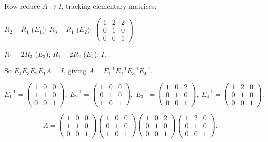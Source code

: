\documentclass[12pt,a3paper]{article}
\begin{document}
\begin{tcolorbox}[enhanced,breakable,
  colback=cB!4,colframe=cB,boxrule=0.8pt,arc=5pt,
  title={\textbf{Answer --- Factorize $A=\begin{pmatrix}1&2&2\\1&3&2\\1&2&3\end{pmatrix}$ into Elementary Matrices}},
  fonttitle=\bfseries\color{white},colbacktitle=cB]

Row reduce $A\to I$, tracking elementary matrices:

$R_2-R_1$ ($E_1$); $R_3-R_1$ ($E_2$):
$\begin{pmatrix}1&2&2\\0&1&0\\0&0&1\end{pmatrix}$

$R_1-2R_3$ ($E_3$); $R_1-2R_2$ ($E_4$): $I$.

So $E_4E_3E_2E_1A=I$, giving $A=E_1^{-1}E_2^{-1}E_3^{-1}E_4^{-1}$.

\[
E_1^{-1}=\begin{pmatrix}1&0&0\\1&1&0\\0&0&1\end{pmatrix},\;
E_2^{-1}=\begin{pmatrix}1&0&0\\0&1&0\\1&0&1\end{pmatrix},\;
E_3^{-1}=\begin{pmatrix}1&0&2\\0&1&0\\0&0&1\end{pmatrix},\;
E_4^{-1}=\begin{pmatrix}1&2&0\\0&1&0\\0&0&1\end{pmatrix}.
\]

\[
A = \begin{pmatrix}1&0&0\\1&1&0\\0&0&1\end{pmatrix}\begin{pmatrix}1&0&0\\0&1&0\\1&0&1\end{pmatrix}\begin{pmatrix}1&0&2\\0&1&0\\0&0&1\end{pmatrix}\begin{pmatrix}1&2&0\\0&1&0\\0&0&1\end{pmatrix}.
\]

\end{tcolorbox}
\end{document}
